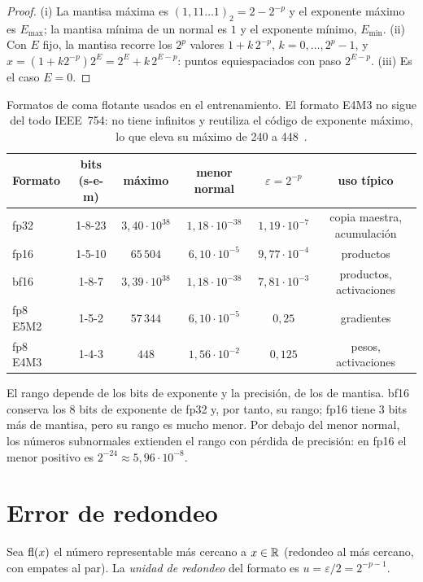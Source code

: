 \begin{proof}
(i) La mantisa máxima es $(1{,}11\dots1)_2=2-2^{-p}$ y el exponente máximo es $E_{\max}$; la mantisa mínima de un normal es $1$ y el exponente mínimo, $E_{\min}$. (ii) Con $E$ fijo, la mantisa recorre los $2^{p}$ valores $1+k\,2^{-p}$, $k=0,\dots,2^{p}-1$, y $x=(1+k2^{-p})2^{E}=2^{E}+k\,2^{E-p}$: puntos equiespaciados con paso $2^{E-p}$. (iii) Es el caso $E=0$.
\end{proof}

\begin{table}[h]
\centering\small
\begin{tabular}{@{}lccccc@{}}
\toprule
Formato & bits (s-e-m) & máximo & menor normal & $\varepsilon=2^{-p}$ & uso típico \\
\midrule
fp32 & 1-8-23 & $3{,}40\cdot 10^{38}$ & $1{,}18\cdot 10^{-38}$ & $1{,}19\cdot 10^{-7}$ & copia maestra, acumulación \\
fp16 & 1-5-10 & $65\,504$ & $6{,}10\cdot 10^{-5}$ & $9{,}77\cdot 10^{-4}$ & productos \\
bf16 & 1-8-7 & $3{,}39\cdot 10^{38}$ & $1{,}18\cdot 10^{-38}$ & $7{,}81\cdot 10^{-3}$ & productos, activaciones \\
fp8 E5M2 & 1-5-2 & $57\,344$ & $6{,}10\cdot 10^{-5}$ & $0{,}25$ & gradientes \\
fp8 E4M3 & 1-4-3 & $448$ & $1{,}56\cdot 10^{-2}$ & $0{,}125$ & pesos, activaciones \\
\bottomrule
\end{tabular}
\caption{Formatos de coma flotante usados en el entrenamiento. El formato E4M3 no sigue del todo IEEE~754: no tiene infinitos y reutiliza el código de exponente máximo, lo que eleva su máximo de 240 a 448~\cite{fp8}.}
\label{tab:formatos}
\end{table}

El rango depende de los bits de exponente y la precisión, de los de mantisa. bf16 conserva los 8 bits de exponente de fp32 y, por tanto, su rango; fp16 tiene 3 bits más de mantisa, pero su rango es mucho menor. Por debajo del menor normal, los números subnormales extienden el rango con pérdida de precisión: en fp16 el menor positivo es $2^{-24}\approx 5{,}96\cdot 10^{-8}$.

\section{Error de redondeo}

\begin{definicion}
Sea $\operatorname{fl}(x)$ el número representable más cercano a $x\in\mathbb{R}$ (redondeo al más cercano, con empates al par). La \emph{unidad de redondeo} del formato es $u=\varepsilon/2=2^{-p-1}$.
\end{definicion}

